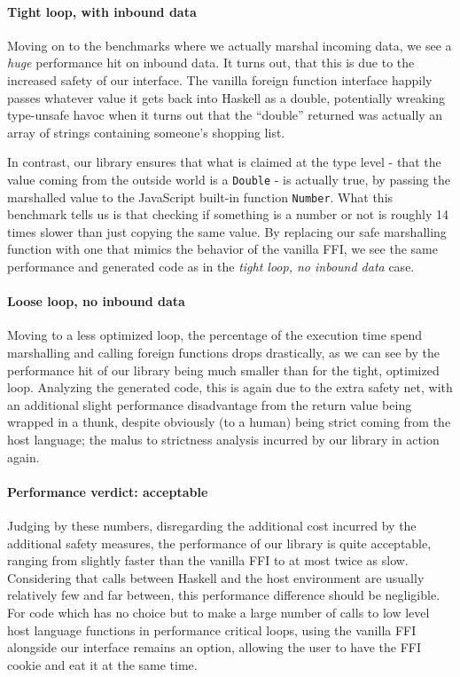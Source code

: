 \documentclass{sigplanconf}
\begin{document}
\paragraph{Tight loop, with inbound data}
Moving on to the benchmarks where we actually marshal incoming data, we see a
\emph{huge} performance hit on inbound data. It turns out, that this is due to
the increased safety of our interface. The vanilla foreign function
interface happily passes whatever value it gets back into Haskell as a double,
potentially wreaking type-unsafe havoc when it turns out that the ``double''
returned was actually an array of strings containing someone's shopping list.

In contrast, our library ensures that what is claimed at the type level - that
the value coming from the outside world is a \lstinline!Double! - is actually
true, by passing the marshalled value to the JavaScript built-in function
\lstinline!Number!. What this benchmark tells us is that checking if something
is a number or not is roughly 14 times slower than just copying the same value.
By replacing our safe marshalling function with one that mimics the behavior
of the vanilla FFI, we see the same performance and generated code as in the
\emph{tight loop, no inbound data} case.

\paragraph{Loose loop, no inbound data}
Moving to a less optimized loop, the percentage of the execution time spend
marshalling and calling foreign functions drops drastically, as we can see by
the performance hit of our library being much smaller than for the tight,
optimized loop. Analyzing the generated code, this is again due to the extra
safety net, with an additional slight performance disadvantage from the return
value being wrapped in a thunk, despite obviously (to a human) being strict
coming from the host language; the malus to strictness analysis incurred by
our library in action again.

\paragraph{Performance verdict: acceptable}
Judging by these numbers, disregarding the additional cost incurred by the
additional safety measures, the performance of our library is quite acceptable,
ranging from slightly faster than the vanilla FFI to at most twice as slow.
Considering that calls between Haskell and the host environment are usually
relatively few and far between, this performance difference should be
negligible. For code which has no choice but to make a large number of calls to
low level host language functions in performance critical loops,
using the vanilla FFI alongside our interface remains an option,
allowing the user to have the FFI cookie and eat it at the same time.
\end{document}
